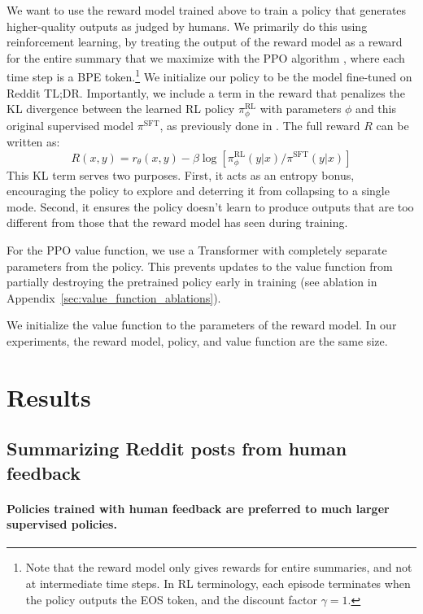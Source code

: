 We want to use the reward model trained above to train a policy that generates higher-quality outputs as judged by humans. We primarily do this using reinforcement learning, by treating the output of the reward model as a reward for the entire summary that we maximize with the PPO algorithm \cite{schulman2017proximal}, where each time step is a BPE token.\footnote{Note that the reward model only gives rewards for entire summaries, and not at intermediate time steps. In RL terminology, each episode terminates when the policy outputs the EOS token, and the discount factor $\gamma=1$.} We initialize our policy to be the model fine-tuned on Reddit TL;DR.  Importantly, we include a term in the reward that penalizes the KL divergence between the learned RL policy $\pi^{\text{RL}}_\phi$ with parameters $\phi$ and this original supervised model $\pi^{\text{SFT}}$, as previously done in \cite{jaques2019way}. The full reward $R$ can be written as: $$ R(x, y) = r_\theta(x, y) - \beta \log [ \pi^{\text{RL}}_\phi (y|x) / \pi^{\text{SFT}} (y|x) ] $$ This KL term serves two purposes. First, it acts as an entropy bonus, encouraging the policy to explore and deterring it from collapsing to a single mode. Second, it ensures the policy doesn’t learn to produce outputs that are too different from those that the reward model has seen during training.

For the PPO value function, we use a Transformer with completely separate parameters from the policy. This prevents updates to the value function from partially destroying the pretrained policy early in training (see ablation in Appendix~\ref{sec:value_function_ablations}). 

We initialize the value function to the parameters of the reward model. In our experiments, the reward model, policy, and value function are the same size.

\section{Results}
\label{sec:results}

\subsection{Summarizing Reddit posts from human feedback} \label{sec:main_results}

\paragraph{Policies trained with human feedback are preferred to much larger supervised policies.}

